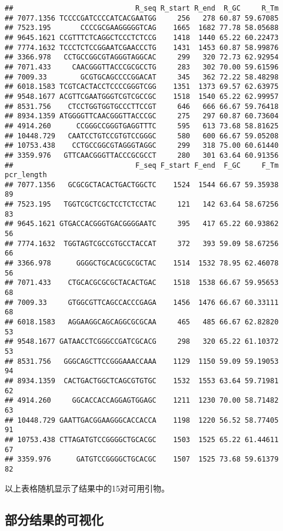 \documentclass[
]{article}
\begin{document}
\begin{verbatim}
##                             R_seq R_start R_end  R_GC     R_Tm
## 7077.1356 TCCCCGATCCCCATCACGAATGG     256   278 60.87 59.67085
## 7523.195       CCCCGCGAAGGGGGTCAG    1665  1682 77.78 58.05688
## 9645.1621 CCGTTTCTCAGGCTCCCTCTCCG    1418  1440 65.22 60.22473
## 7774.1632 TCCCTCTCCGGAATCGAACCCTG    1431  1453 60.87 58.99876
## 3366.978   CCTGCCGGCGTAGGGTAGGCAC     299   320 72.73 62.92954
## 7071.433     CAACGGGTTACCCGCGCCTG     283   302 70.00 59.61596
## 7009.33        GCGTGCAGCCCCGGACAT     345   362 72.22 58.48298
## 6018.1583 TCGTCACTACCTCCCCGGGTCGG    1351  1373 69.57 62.63975
## 9548.1677 ACGTTCGAATGGGTCGTCGCCGC    1518  1540 65.22 62.99957
## 8531.756    CTCCTGGTGGTGCCCTTCCGT     646   666 66.67 59.76418
## 8934.1359 ATGGGGTTCAACGGGTTACCCGC     275   297 60.87 60.73604
## 4914.260      CCGGGCCGGGTGAGGTTTC     595   613 73.68 58.81625
## 10448.729   CAATCCTGTCCGTGTCCGGGC     580   600 66.67 59.05208
## 10753.438    CCTGCCGGCGTAGGGTAGGC     299   318 75.00 60.61440
## 3359.976   GTTCAACGGGTTACCCGCGCCT     280   301 63.64 60.91356
##                             F_seq F_start F_end  F_GC     F_Tm pcr_length
## 7077.1356   GCGCGCTACACTGACTGGCTC    1524  1544 66.67 59.35938         89
## 7523.195   TGGTCGCTCGCTCCTCTCCTAC     121   142 63.64 58.67256         83
## 9645.1621 GTGACCACGGGTGACGGGGAATC     395   417 65.22 60.93862         56
## 7774.1632  TGGTAGTCGCCGTGCCTACCAT     372   393 59.09 58.67256         66
## 3366.978      GGGGCTGCACGCGCGCTAC    1514  1532 78.95 62.46078         56
## 7071.433    CTGCACGCGCGCTACACTGAC    1518  1538 66.67 59.95653         68
## 7009.33     GTGGCGTTCAGCCACCCGAGA    1456  1476 66.67 60.33111         68
## 6018.1583   AGGAAGGCAGCAGGCGCGCAA     465   485 66.67 62.82820         53
## 9548.1677 GATAACCTCGGGCCGATCGCACG     298   320 65.22 61.10372         53
## 8531.756   GGGCAGCTTCCGGGAAACCAAA    1129  1150 59.09 59.19053         94
## 8934.1359  CACTGACTGGCTCAGCGTGTGC    1532  1553 63.64 59.71981         62
## 4914.260     GGCACCACCAGGAGTGGAGC    1211  1230 70.00 58.71482         63
## 10448.729 GAATTGACGGAAGGGCACCACCA    1198  1220 56.52 58.77405         91
## 10753.438 CTTAGATGTCCGGGGCTGCACGC    1503  1525 65.22 61.44611         67
## 3359.976      GATGTCCGGGGCTGCACGC    1507  1525 73.68 59.61379         82
\end{verbatim}

以上表格随机显示了结果中的15对可用引物。

\hypertarget{ux90e8ux5206ux7ed3ux679cux7684ux53efux89c6ux5316}{%
\subsection{部分结果的可视化}\label{ux90e8ux5206ux7ed3ux679cux7684ux53efux89c6ux5316}}
\end{document}
